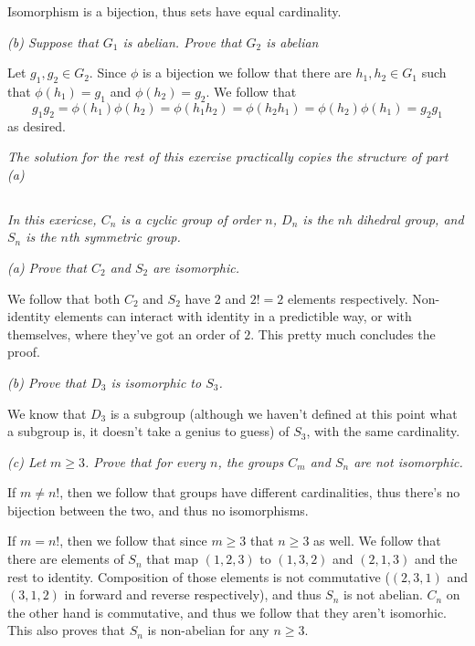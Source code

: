 \documentclass[11pt,oneside,titlepage]{book}
\begin{document}
Isomorphism is a bijection, thus sets have equal cardinality.

\textit{(b) Suppose that $G_1$ is abelian. Prove that $G_2$ is
abelian}

Let $g_1, g_2 \in G_2$. Since $\phi$ is a bijection we follow that there are
$h_1, h_2 \in G_1$ such that $\phi(h_1) = g_1$ and $\phi(h_2) = g_2$.
We follow that
$$g_1 g_2 = \phi(h_1) \phi(h_2) = \phi(h_1 h_2) = \phi(h_2 h_1) = \phi(h_2) \phi(h_1) = g_2 g_1$$
as desired.

\textit{The solution for the rest of this exercise practically copies
  the structure of part (a) }

\subsection{}

\textit{In this exericse, $C_n$ is a cyclic group of order $n$, $D_n$
  is the $n$h dihedral group, and $S_n$ is the $n$th symmetric group.}

\textit{(a) Prove that $C_2$ and $S_2$ are isomorphic.}

We follow that both $C_2$ and $S_2$ have $2$ and $2! = 2$ elements
respectively. Non-identity elements can interact with identity in a
predictible way, or with themselves, where they've got an order of
$2$. This pretty much concludes the proof.

\textit{(b) Prove that $D_3$ is isomorphic to $S_3$.}

We know that $D_3$ is a subgroup (although we haven't defined at this
point what a subgroup is, it doesn't take a genius to guess) of $S_3$,
with the same cardinality.

\textit{(c) Let $m \geq 3$. Prove that for every $n$, the groups $C_m$ and $S_n$ are not
  isomorphic.}

If $m \neq n!$, then we follow that groups have different cardinalities, thus
there's no bijection between the two, and thus no isomorphisms.

If $m = n!$, then we follow that since $m \geq 3$ that $n \geq 3$ as
well.  We follow that there are elements of $S_n$ that map $(1, 2, 3)$
to $(1, 3, 2)$ and $(2, 1, 3)$ and the rest to identity. Composition
of those elements is not commutative ($(2, 3, 1)$ and $(3, 1, 2)$ in
forward and reverse respectively), and thus $S_n$ is not abelian.
$C_n$ on the other hand is commutative, and thus we follow
that they aren't isomorhic. This also proves that $S_n$ is non-abelian
for any $n \geq 3$.
\end{document}
